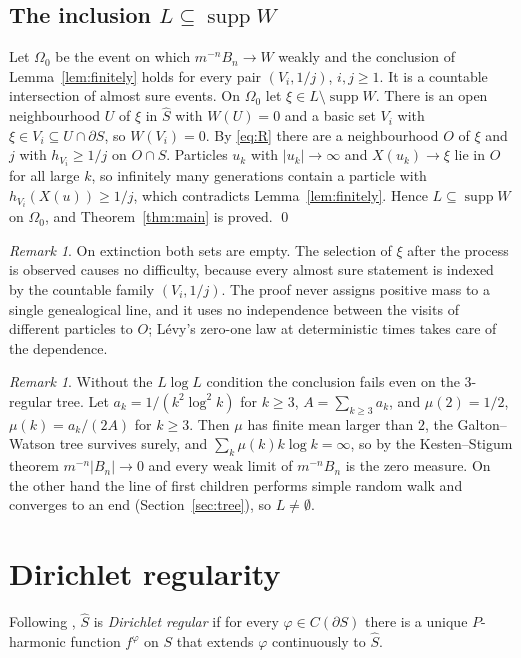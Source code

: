 \documentclass[11pt]{amsart}
\theoremstyle{definition}
\theoremstyle{remark}
\newtheorem{remark}[theorem]{Remark}
\numberwithin{equation}{section}
\newcommand{\1}{\mathbf 1}
\newcommand{\K}{\widehat S}
\newcommand{\bd}{\partial S}
\begin{document}
\subsection{The inclusion $L\subseteq\operatorname{supp}W$}
Let $\Omega_0$ be the event on which $m^{-n}B_n\to W$ weakly and the conclusion of Lemma~\ref{lem:finitely} holds for every pair $(V_i,1/j)$, $i,j\ge1$. It is a countable intersection of almost sure events. On $\Omega_0$ let $\xi\in L\setminus\operatorname{supp}W$. There is an open neighbourhood $U$ of $\xi$ in $\K$ with $W(U)=0$ and a basic set $V_i$ with $\xi\in V_i\subseteq U\cap\bd$, so $W(V_i)=0$. By \eqref{eq:R} there are a neighbourhood $O$ of $\xi$ and $j$ with $h_{V_i}\ge1/j$ on $O\cap S$. Particles $u_k$ with $|u_k|\to\infty$ and $X(u_k)\to\xi$ lie in $O$ for all large $k$, so infinitely many generations contain a particle with $h_{V_i}(X(u))\ge1/j$, which contradicts Lemma~\ref{lem:finitely}. Hence $L\subseteq\operatorname{supp}W$ on $\Omega_0$, and Theorem~\ref{thm:main} is proved. \qed

\begin{remark}
On extinction both sets are empty. The selection of $\xi$ after the process is observed causes no difficulty, because every almost sure statement is indexed by the countable family $(V_i,1/j)$. The proof never assigns positive mass to a single genealogical line, and it uses no independence between the visits of different particles to $O$; L\'evy's zero-one law at deterministic times takes care of the dependence.
\end{remark}

\begin{remark}\label{rem:LlogL}
Without the $L\log L$ condition the conclusion fails even on the $3$-regular tree. Let $a_k=1/(k^2\log^2k)$ for $k\ge3$, $A=\sum_{k\ge3}a_k$, and $\mu(2)=1/2$, $\mu(k)=a_k/(2A)$ for $k\ge3$. Then $\mu$ has finite mean larger than $2$, the Galton--Watson tree survives surely, and $\sum_k\mu(k)k\log k=\infty$, so by the Kesten--Stigum theorem $m^{-n}|B_n|\to0$ and every weak limit of $m^{-n}B_n$ is the zero measure. On the other hand the line of first children performs simple random walk and converges to an end (Section~\ref{sec:tree}), so $L\neq\emptyset$.
\end{remark}

\section{Dirichlet regularity}

Following \cite[Definition~3.17]{KW}, $\K$ is \emph{Dirichlet regular} if for every $\varphi\in C(\bd)$ there is a unique $P$-harmonic function $f^\varphi$ on $S$ that extends $\varphi$ continuously to $\K$.
\end{document}
